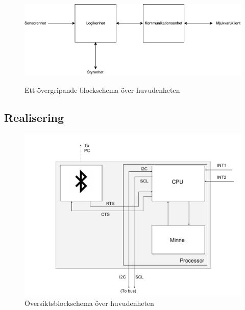 \documentclass{article}
\begin{document}
\begin{figure}[H]
  \centering
  \includegraphics[scale=0.5]{Huvudenhet} \\
  \caption{Ett övergripande blockschema över huvudenheten}
  \label{fig:huvudenhet}
\end{figure}

\subsection{Realisering}

\begin{figure}[H]
\centering
\includegraphics[scale=0.25]{Huvudmodul_oversikt_blockschema}
\caption{Översiktsblockschema över huvudenheten}
\label{fig:huvudmodul}
\end{figure}
\end{document}

